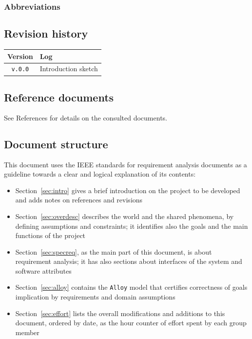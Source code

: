 \documentclass[12pt]{article}
\begin{document}
      \begin{description}
        \item[]
      \end{description}

    \subsubsection{Abbreviations}

      \begin{description}
        \item[]
      \end{description}

  \subsection{Revision history}
  
  \label{sec:revhistory}
    \begin{table}[!h]
      \begin{tabular}{|c|l|}
        \hline
        \textbf{Version}                & \textbf{Log} \\ \hline
        \texttt{v.0.0} &
          Introduction sketch
        \\ \hline
      \end{tabular}
    \end{table}

  \subsection{Reference documents}

    See References for details on the consulted documents.

  \subsection{Document structure}

    This document uses the IEEE standards for requirement analysis documents as a guideline towards a clear and logical explanation of its contents:
    \begin{itemize}
      \item Section~\ref{sec:intro} gives a brief introduction on the project to be developed and adds notes on references and revisions
      \item Section~\ref{sec:overdesc} describes the world and the shared phenomena, by defining assumptions and constraints; it identifies also the goals and the main functions of the project
      \item Section~\ref{sec:specreq}, as the main part of this document, is about requirement analysis; it has also sections about interfaces of the system and software attributes
      \item Section~\ref{sec:alloy} contains the \texttt{Alloy} model that certifies correctness of goals implication by requirements and domain assumptions
      \item Section~\ref{sec:effort} lists the overall modifications and additions to this document, ordered by date, as the hour counter of effort spent by each group member
    \end{itemize}
\end{document}
